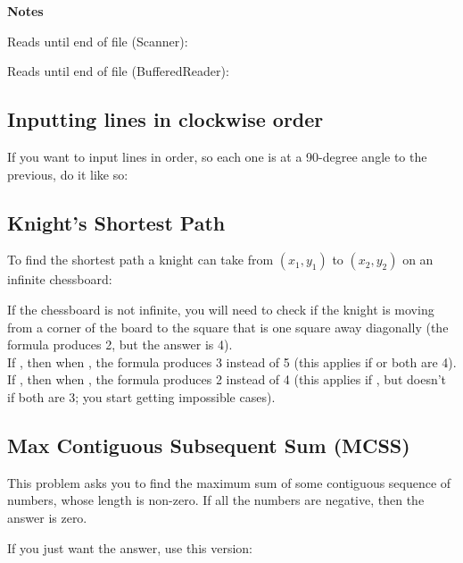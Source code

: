 \textbf{Notes}

Reads until end of file (Scanner): 

Reads until end of file (BufferedReader): 

\subsection*{Inputting lines in clockwise order}

If you want to input lines in order, so each one is at a 90-degree angle to the previous, do it like so:



\subsection*{Knight's Shortest Path}

To find the shortest path a knight can take from $(x_1, y_1)$ to $(x_2, y_2)$ on an infinite chessboard:



If the chessboard is not infinite, you will need to check if the knight is moving from a corner of the board to the square that is one square away diagonally (the formula produces 2, but the answer is 4). \\
If , then when , the formula produces 3 instead of 5 (this applies if  or both are 4). \\
If , then when , the formula produces 2 instead of 4 (this applies if , but doesn't if both are 3; you start getting impossible cases).


\subsection*{Max Contiguous Subsequent Sum (MCSS)}

This problem asks you to find the maximum sum of some contiguous sequence of numbers, whose length is non-zero. If all the numbers are negative, then the answer is zero.

If you just want the answer, use this version:



